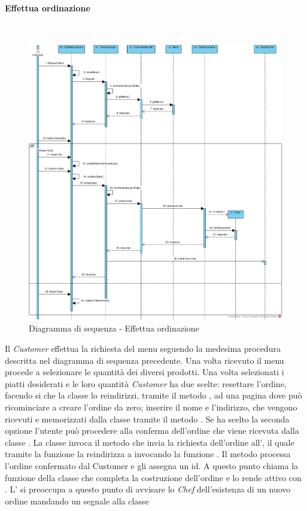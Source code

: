 \paragraph{Effettua ordinazione}\mbox{} \\
\pagestyle{empty}
\begin{figure}[H]
	\centering
	\includegraphics[width=19cm]{./diagrammi/sequenza/faiordinazione.png}
	\caption{Diagramma di sequenza - Effettua ordinazione}
\end{figure}
\restoregeometry
\pagestyle{plain}
Il \textit{Customer} effettua la richiesta del menu seguendo la medesima procedura descritta nel diagramma di sequenza precedente. Una volta ricevuto il menu procede a selezionare le quantità dei diversi prodotti. Una volta selezionati i piatti desiderati e le loro quantità \textit{Customer} ha due scelte: resettare l'ordine, facendo si che la classe  lo reindirizzi, tramite il metodo , ad una pagina dove può ricominciare a creare l'ordine da zero; inserire il nome e l'indirizzo, che vengono ricevuti e memorizzati dalla classe  tramite il metodo . Se ha scelto la seconda opzione l'utente può procedere alla conferma dell'ordine che viene ricevuta dalla classe . La classe invoca il metodo  che invia la richiesta dell'ordine all', il quale tramite la funzione  la reindirizza a  invocando la funzione . Il metodo processa l’ordine confermato dal Customer e gli assegna un id. A questo punto chiama la funzione  della classe  che completa la costruzione dell'ordine e lo rende attivo con . L' si preoccupa a questo punto di avvisare lo \textit{Chef} dell'esistenza di un nuovo ordine mandando un segnale alla classe   

